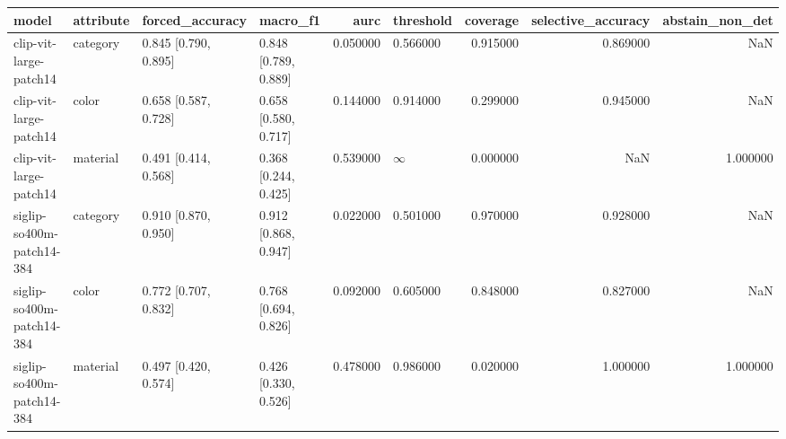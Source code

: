 \begin{tabular}{llllrlrrr}
\toprule
model & attribute & forced\_accuracy & macro\_f1 & aurc & threshold & coverage & selective\_accuracy & abstain\_non\_det \\
\midrule
clip-vit-large-patch14 & category & 0.845 [0.790, 0.895] & 0.848 [0.789, 0.889] & 0.050000 & 0.566000 & 0.915000 & 0.869000 & NaN \\
clip-vit-large-patch14 & color & 0.658 [0.587, 0.728] & 0.658 [0.580, 0.717] & 0.144000 & 0.914000 & 0.299000 & 0.945000 & NaN \\
clip-vit-large-patch14 & material & 0.491 [0.414, 0.568] & 0.368 [0.244, 0.425] & 0.539000 & $\infty$ & 0.000000 & NaN & 1.000000 \\
siglip-so400m-patch14-384 & category & 0.910 [0.870, 0.950] & 0.912 [0.868, 0.947] & 0.022000 & 0.501000 & 0.970000 & 0.928000 & NaN \\
siglip-so400m-patch14-384 & color & 0.772 [0.707, 0.832] & 0.768 [0.694, 0.826] & 0.092000 & 0.605000 & 0.848000 & 0.827000 & NaN \\
siglip-so400m-patch14-384 & material & 0.497 [0.420, 0.574] & 0.426 [0.330, 0.526] & 0.478000 & 0.986000 & 0.020000 & 1.000000 & 1.000000 \\
\bottomrule
\end{tabular}
